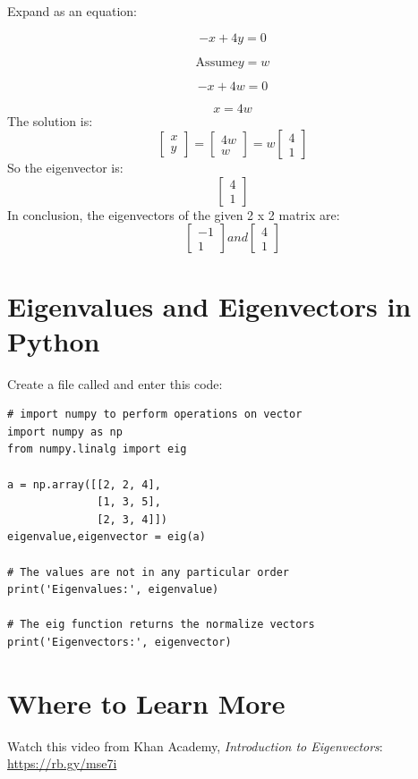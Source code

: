 Expand as an equation:

$$-x + 4y = 0$$

$$\text{Assume} y = w$$

$$-x + 4w = 0$$

$$x = 4w$$
The solution is:
$$\begin{bmatrix}
x\\
y 
\end{bmatrix}=
\begin{bmatrix}
4w\\
w 
\end{bmatrix} =
w\begin{bmatrix}
4\\
1 
\end{bmatrix}$$
So the eigenvector is:
$$\begin{bmatrix}
4\\
1
\end{bmatrix}$$
In conclusion, the eigenvectors of the given 2 x 2 matrix are:
$$\begin{bmatrix}
-1\\
1
\end{bmatrix}
and \begin{bmatrix}
4\\
1
\end{bmatrix}$$

\section{Eigenvalues and Eigenvectors in Python}
Create a file called  and enter this code:

\begin{Verbatim}
# import numpy to perform operations on vector
import numpy as np
from numpy.linalg import eig

a = np.array([[2, 2, 4], 
              [1, 3, 5],
              [2, 3, 4]])
eigenvalue,eigenvector = eig(a)

# The values are not in any particular order
print('Eigenvalues:', eigenvalue)

# The eig function returns the normalize vectors
print('Eigenvectors:', eigenvector)

\end{Verbatim}

\section{Where to Learn More}
Watch this video from Khan Academy, \emph{Introduction to Eigenvectors}: \url{https://rb.gy/mse7i}
